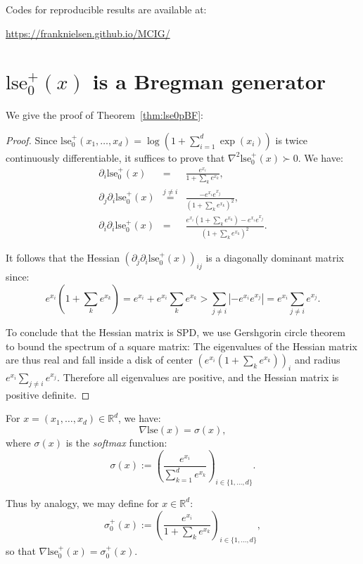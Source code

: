\documentclass[graybox]{svmult}
\def\lse{\mathrm{lse}}
\def\eqdef{:=}
\def\bbR{\mathbb{R}}
\begin{document}
\vskip 0.5cm
Codes for reproducible results are available at: \\
\centerline{\url{https://franknielsen.github.io/MCIG/}}





\appendix

\section{$\lse_0^+(x)$ is a Bregman generator\label{sec:proof-lse0p}}
We give the proof of Theorem~\ref{thm:lse0pBF}:
 

\begin{proof}
Since $\lse_0^+(x_1,\ldots, x_d)=\log \left(1+ \sum_{i=1}^d \exp(x_i)\right)$ is twice continuously differentiable, it suffices to prove that $\nabla^2\lse_0^+(x)\succ 0$.
We have:
\begin{eqnarray}
\partial_i \lse_0^+(x) &=& \frac{e^{x_i}}{1+\sum_k e^{x_k}},\\
\partial_j\partial_i \lse_0^+(x) &\stackrel{j\not = i}{=}&  \frac{-e^{x_i} e^{x_j} }{(1+\sum_k e^{x_k})^2},\\
 \partial_i\partial_i \lse_0^+(x) &=&  \frac{e^{x_i}(1+\sum_k e^{x_k}) -e^{x_i} e^{x_j} }{(1+\sum_k e^{x_k})^2}.
\end{eqnarray}

It follows that the Hessian $(\partial_j\partial_i \lse_0^+(x))_{ij}$ is a diagonally dominant matrix since:
\begin{equation}
e^{x_i}\left(1+\sum_k e^{x_k}\right) = e^{x_i} + e^{x_i}\sum_k e^{x_k} > \sum_{j\not =i} \left|-e^{x_i} e^{x_j} \right| = e^{x_i}  \sum_{j\not =i} e^{x_j}.
\end{equation}

To conclude that the Hessian matrix is SPD, we use Gershgorin circle theorem~\cite{Gervsgorin-2010} to bound the spectrum of a square matrix: 
The eigenvalues of the Hessian matrix are thus real and fall inside a disk of center $(e^{x_i}(1+\sum_k e^{x_k}))_i$ and radius $e^{x_i}  \sum_{j\not =i} e^{x_j}$. Therefore all eigenvalues are positive, and the Hessian matrix is positive definite.

\end{proof}

For $x=(x_1,\ldots, x_d)\in\bbR^d$, we have:
\begin{equation}
 \nabla\lse(x) = \sigma(x),
\end{equation}
where $\sigma(x)$ is the {\em softmax} function:
\begin{equation}
\sigma(x) \eqdef \left( \frac{e^{x_i}}{\sum_{k=1}^d e^{x_k}} \right)_{i\in\{1,\ldots, d\}}.
\end{equation}

Thus by analogy, we may define for $x\in\bbR^d$:
\begin{equation}
\sigma_0^+(x) \eqdef \left( \frac{e^{x_i}}{1+\sum_k e^{x_k}} \right)_{i\in\{1,\ldots, d\}},
\end{equation}
so that $\nabla \lse_0^+(x) =\sigma_0^+(x)$.
\end{document}
